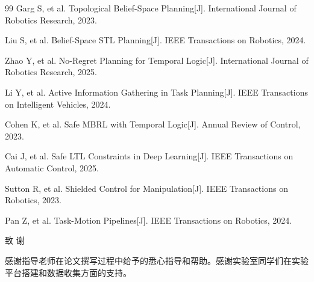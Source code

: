 \documentclass[12pt,a4paper]{ctexart}
\numberwithin{equation}{section}
\begin{document}
\begin{thebibliography}{99}
    Garg S, et al. Topological Belief-Space Planning[J]. International Journal of Robotics Research, 2023.

    Liu S, et al. Belief-Space STL Planning[J]. IEEE Transactions on Robotics, 2024.

    Zhao Y, et al. No-Regret Planning for Temporal Logic[J]. International Journal of Robotics Research, 2025.

    Li Y, et al. Active Information Gathering in Task Planning[J]. IEEE Transactions on Intelligent Vehicles, 2024.

    Cohen K, et al. Safe MBRL with Temporal Logic[J]. Annual Review of Control, 2023.

    Cai J, et al. Safe LTL Constraints in Deep Learning[J]. IEEE Transactions on Automatic Control, 2025.

    Sutton R, et al. Shielded Control for Manipulation[J]. IEEE Transactions on Robotics, 2023.

    Pan Z, et al. Task-Motion Pipelines[J]. IEEE Transactions on Robotics, 2024.

\end{thebibliography}

\clearpage
\begin{center}
{\heiti{} 致 谢}
\end{center}

感谢指导老师在论文撰写过程中给予的悉心指导和帮助。感谢实验室同学们在实验平台搭建和数据收集方面的支持。
\end{document}
